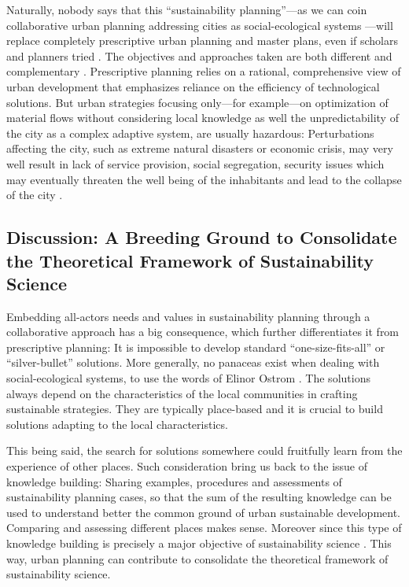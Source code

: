 \documentclass[10pt,a4paper]{article}
\begin{document}
\begin{multicols}{2}
Naturally, nobody says that this ``sustainability planning''---as we can coin collaborative urban planning addressing cities as social-ecological systems \citep{r127}---will replace completely prescriptive urban planning and master plans, even if scholars and planners tried \citep{r128}. The objectives and approaches taken are both different and complementary \citep{r129, r130}. Prescriptive planning relies on a rational, comprehensive view of urban development that emphasizes reliance on the efficiency of technological solutions. But urban strategies focusing only---for example---on optimization of material flows without considering local knowledge as well the unpredictability of the city as a complex adaptive system, are usually hazardous: Perturbations affecting the city, such as extreme natural disasters or economic crisis, may very well result in lack of service provision, social segregation, security issues which may eventually threaten the well being of the inhabitants and lead to the collapse of the city \citep{r131}.

\subsection{Discussion: A Breeding Ground to Consolidate the Theoretical Framework of Sustainability Science} 
\noindent Embedding all-actors needs and values in sustainability planning through a collaborative approach has a big consequence, which further differentiates it from prescriptive planning: It is impossible to develop standard ``one-size-fits-all'' or ``silver-bullet'' solutions. More generally, no panaceas exist when dealing with social-ecological systems, to use the words of Elinor Ostrom \citep{r132}. The solutions always depend on the characteristics of the local communities in crafting sustainable strategies. They are typically place-based and it is crucial to build solutions adapting to the local characteristics. 

This being said, the search for solutions somewhere could fruitfully learn from the experience of other places. Such consideration bring us back to the issue of knowledge building: Sharing examples, procedures and assessments of sustainability planning cases, so that the sum of the resulting knowledge can be used to understand better the common ground of urban sustainable development. Comparing and assessing different places makes sense. Moreover since this type of knowledge building is precisely a major objective of sustainability science \citep{r133, r134}. This way, urban planning can contribute to consolidate the theoretical framework of sustainability science.


\end{multicols}
\end{document}
